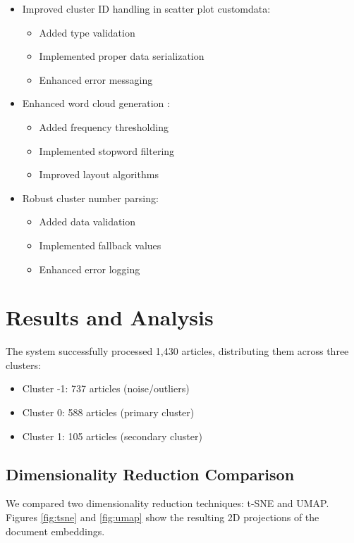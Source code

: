\documentclass[conference]{IEEEtran}
\begin{document}
\begin{itemize}
    \item Improved cluster ID handling in scatter plot customdata:
        \begin{itemize}
            \item Added type validation
            \item Implemented proper data serialization
            \item Enhanced error messaging
        \end{itemize}
    \item Enhanced word cloud generation \cite{mcinerney2017exploring}:
        \begin{itemize}
            \item Added frequency thresholding
            \item Implemented stopword filtering
            \item Improved layout algorithms
        \end{itemize}
    \item Robust cluster number parsing:
        \begin{itemize}
            \item Added data validation
            \item Implemented fallback values
            \item Enhanced error logging
        \end{itemize}
\end{itemize}

\section{Results and Analysis}
The system successfully processed 1,430 articles, distributing them across three clusters:
\begin{itemize}
    \item Cluster -1: 737 articles (noise/outliers)
    \item Cluster 0: 588 articles (primary cluster)
    \item Cluster 1: 105 articles (secondary cluster)
\end{itemize}

\subsection{Dimensionality Reduction Comparison}
We compared two dimensionality reduction techniques: t-SNE and UMAP. Figures \ref{fig:tsne} and \ref{fig:umap} show the resulting 2D projections of the document embeddings.
\end{document}
